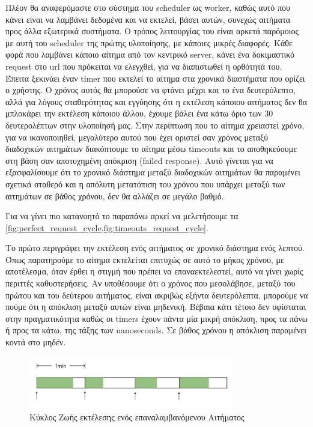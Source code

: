 Πλέον θα αναφερόμαστε στο σύστημα του scheduler ως worker, καθώς αυτό που κάνει είναι να λαμβάνει δεδομένα και να
εκτελεί, βάσει αυτών, συνεχώς αιτήματα προς άλλα εξωτερικά συστήματα. Ο τρόπος λειτουργίας του είναι αρκετά παρόμοιος
με αυτή του scheduler της πρώτης υλοποίησης, με κάποιες μικρές διαφορές. Κάθε φορά που λαμβάνει κάποιο αίτημα από τον κεντρικό server, κάνει ένα δοκιμαστικό request
στο url που πρόκειται να ελεγχθεί, για να διαπιστωθεί η ορθότητά του. Έπειτα ξεκινάει έναν timer που εκτελεί το αίτημα στα χρονικά διαστήματα που ορίζει ο χρήστης. Ο χρόνος αυτός θα μπορούσε να φτάνει μέχρι και το ένα δευτερόλεπτο, αλλά για λόγους σταθερότητας και
εγγύησης ότι η εκτέλεση κάποιου αιτήματος δεν θα μπλοκάρει την εκτέλεση κάποιου άλλου, έχουμε βάλει ένα κάτω όριο των 30 δευτερολέπτων στην υλοποίησή μας.
Στην περίπτωση που το αίτημα χρειαστεί χρόνο, για να ικανοποιηθεί, μεγαλύτερο αυτού που έχει οριστεί σαν χρόνος μεταξύ
διαδοχικών αιτημάτων διακόπτουμε το αίτημα μέσω timeouts και το αποθηκεύουμε στη βάση σαν αποτυχημένη απόκριση (failed response).
Αυτό γίνεται για να εξασφαλίσουμε ότι το χρονικό διάστημα μεταξύ διαδοχικών αιτημάτων θα παραμένει
σχετικά σταθερό και η απόλυτη μετατόπιση του χρόνου που υπάρχει μεταξύ των αιτημάτων σε βάθος χρόνου,
δεν θα αλλάζει σε μεγάλο βαθμό.

Για να γίνει πιο κατανοητό το παραπάνω αρκεί να μελετήσουμε τα \cref{fig:perfect_request_cycle,fig:timeouts_request_cycle}.

Το πρώτο περιγράφει την εκτέλεση ενός αιτήματος σε χρονικό διάστημα ενός λεπτού. Όπως παρατηρούμε το
αίτημα εκτελείται επιτυχώς σε αυτό το μήκος χρόνου, με αποτέλεσμα, όταν έρθει η στιγμή που πρέπει να επαναεκτελεστεί,
αυτό να γίνει χωρίς περιττές καθυστερήσεις. Αν υποθέσουμε ότι ο χρόνος που μεσολάβησε, μεταξύ του πρώτου και του δεύτερου αιτήματος,
είναι ακριβώς εξήντα δευτερόλεπτα, μπορούμε να πούμε ότι η απόκλιση μεταξύ αυτών είναι μηδενική.
Βέβαια κάτι τέτοιο δεν υφίσταται στην πραγματικότητα καθώς οι timers έχουν πάντα μία μικρή απόκλιση, προς τα πάνω ή προς τα κάτω, της τάξης των nanoseconds.
Σε βάθος χρόνου η απόκλιση παραμένει κοντά στο μηδέν.

\begin{figure}[!ht]
	\centering
	\includegraphics[width=0.8\textwidth]{./images/chapter4/perfect_request_cycle.png}
	\caption[Κύκλος Ζωής εκτέλεσης ενός επαναλαμβανόμενου Αιτήματος]{Κύκλος Ζωής εκτέλεσης ενός επαναλαμβανόμενου Αιτήματος}
	\label{fig:perfect_request_cycle}
\end{figure}


